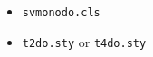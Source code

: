 \documentclass[graybox,sectrefs,envcountresetchap,open=right,final]{svmonodo}
\makeatletter
\def\cleardoublepage{\clearpage\if@twoside \ifodd\c@page\else
\hbox{}
\thispagestyle{empty}
\newpage
\if@twocolumn\hbox{}\newpage\fi\fi\fi}
\makeatother
\begin{document}
\begin{itemize}
 \item \texttt{svmonodo.cls}

 \item \texttt{t2do.sty} or \texttt{t4do.sty}
\end{itemize}

\noindent
\clearemptydoublepage
{}
\thispagestyle{empty}





\cleardoublepage{}  %
\printindex
\end{document}

